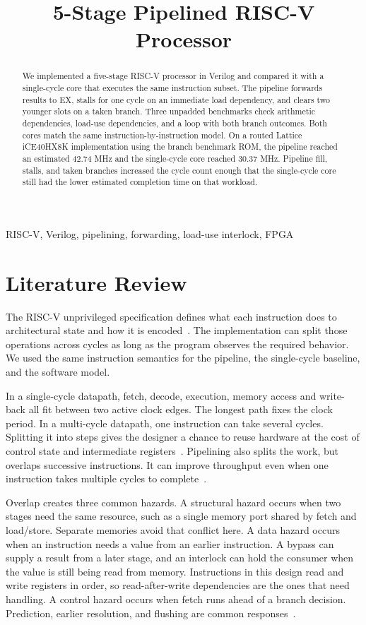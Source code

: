 \documentclass[conference]{IEEEtran}
\title{5-Stage Pipelined RISC-V Processor}
\author{\IEEEauthorblockN{Aryan Kinha, Preetish Ubhrani, Divyanshu Singh,\\Jatin Kumar Singh, Jatin Verma}
\IEEEauthorblockA{Newton School of Technology, Rishihood University}}
\begin{document}
\raggedbottom
\maketitle

\begin{abstract}
We implemented a five-stage RISC-V processor in Verilog and compared it with a single-cycle core that executes the same instruction subset. The pipeline forwards results to EX, stalls for one cycle on an immediate load dependency, and clears two younger slots on a taken branch. Three unpadded benchmarks check arithmetic dependencies, load-use dependencies, and a loop with both branch outcomes. Both cores match the same instruction-by-instruction model. On a routed Lattice iCE40HX8K implementation using the branch benchmark ROM, the pipeline reached an estimated 42.74 MHz and the single-cycle core reached 30.37 MHz. Pipeline fill, stalls, and taken branches increased the cycle count enough that the single-cycle core still had the lower estimated completion time on that workload.
\end{abstract}
\begin{IEEEkeywords}
RISC-V, Verilog, pipelining, forwarding, load-use interlock, FPGA
\end{IEEEkeywords}

\section{Literature Review}
The RISC-V unprivileged specification defines what each instruction does to architectural state and how it is encoded~\cite{isa}. The implementation can split those operations across cycles as long as the program observes the required behavior. We used the same instruction semantics for the pipeline, the single-cycle baseline, and the software model.

In a single-cycle datapath, fetch, decode, execution, memory access and write-back all fit between two active clock edges. The longest path fixes the clock period. In a multi-cycle datapath, one instruction can take several cycles. Splitting it into steps gives the designer a chance to reuse hardware at the cost of control state and intermediate registers~\cite{patterson}. Pipelining also splits the work, but overlaps successive instructions. It can improve throughput even when one instruction takes multiple cycles to complete~\cite{harris}.

Overlap creates three common hazards. A structural hazard occurs when two stages need the same resource, such as a single memory port shared by fetch and load/store. Separate memories avoid that conflict here. A data hazard occurs when an instruction needs a value from an earlier instruction. A bypass can supply a result from a later stage, and an interlock can hold the consumer when the value is still being read from memory. Instructions in this design read and write registers in order, so read-after-write dependencies are the ones that need handling. A control hazard occurs when fetch runs ahead of a branch decision. Prediction, earlier resolution, and flushing are common responses~\cite{patterson,harris}.
\end{document}
